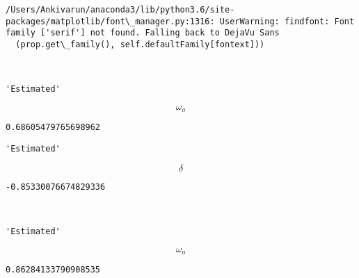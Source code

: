 \documentclass[11pt]{article}
\begin{document}
    \begin{Verbatim}[commandchars=\\\{\}]
/Users/Ankivarun/anaconda3/lib/python3.6/site-packages/matplotlib/font\_manager.py:1316: UserWarning: findfont: Font family ['serif'] not found. Falling back to DejaVu Sans
  (prop.get\_family(), self.defaultFamily[fontext]))

    \end{Verbatim}

    \begin{center}
    \end{center}
    { \hspace*{\fill} \\}
    
    
    \begin{verbatim}
'Estimated'
    \end{verbatim}

    
    $$ \omega_o $$

    
    
    \begin{verbatim}
0.68605479765698962
    \end{verbatim}

    
    
    \begin{verbatim}
'Estimated'
    \end{verbatim}

    
    $$\delta$$

    
    
    \begin{verbatim}
-0.85330076674829336
    \end{verbatim}

    
    \begin{center}
    \end{center}
    { \hspace*{\fill} \\}
    
    
    \begin{verbatim}
'Estimated'
    \end{verbatim}

    
    $$ \omega_o $$

    
    
    \begin{verbatim}
0.86284133790908535
    \end{verbatim}
\end{document}

